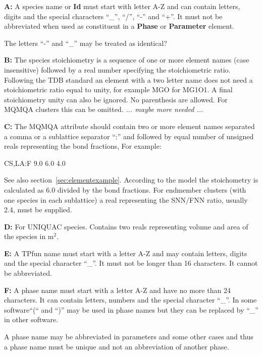 \documentclass{article}
\begin{document}
\begin{description}
\item{\bf A:}\label{sec:noteA} A species name or {\bf Id} must start
  with letter A-Z and can contain letters, digits and the special
  characters ``\_'', ``/'', ``-'' and ``+''.  It must not be
  abbreviated when used as constituent in a {\bf Phase} or {\bf
    Parameter} element.

  The letters ``-'' and ``\_'' may be treated as identical?

\item{\bf B:} The species stoichiometry is a sequence of one or more
  element names (case insensitive) followed by a real number
  specifying the stoichiometric ratio.  Following the TDB standard an
  element with a two letter name does not need a stoichiometric ratio
  equal to unity, for example MGO for MG1O1.  A final stoichiometry
  unity can also be ignored.  No parenthesis are allowed.  For MQMQA
  clusters this can be omitted.  {\em ... maybe more needed ...}

\item{\bf C:} The MQMQA attribute should contain two or more element
  names separated a comma or a sublattice separator ``:'' and
  followed by equal number of unsigned reals representing the bond
  fractions, For example:

  CS,LA:F  9.0 6.0 4.0

  See also section~\ref{sec:elementexample}.  According to the model
  the stoichometry is calculated as 6.0 divided by the bond fractions.
  For endmember clusters (with one species in each sublattice) a real
  representing the SNN/FNN ratio, usually 2.4, must be supplied.

\item{\bf D:} For UNIQUAC species.  Contains two reals representing
  volume and area of the species in m$^2$.

\item{\bf E:} A TPfun name must start with a letter A-Z and may
  contain letters, digits and the special character ``\_''.  It must
  not be longer than 16 characters.  It cannot be abbreviated.

\item{\bf F:} A phase name must start with a letter A-Z and have no
  more than 24 characters.  It can
  contain letters, numbers and the special character ``\_''.  In some
  software``(`` and ``)'' may be used in phase names but they can be
  replaced by ``\_'' in other software.

  A phase name may be abbreviated in parameters and some other cases
  and thus a phase name must be unique and not an abbreviation of
  another phase.


\end{description}
\end{document}
